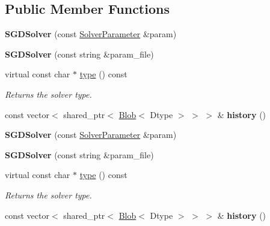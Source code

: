 \subsection*{Public Member Functions}
\begin{DoxyCompactItemize}
\item 
\mbox{\label{classcaffe_1_1_s_g_d_solver_a144735c352c1eff4e3bb3f8f03c81d4b}} 
{\bfseries S\+G\+D\+Solver} (const \mbox{\hyperlink{classcaffe_1_1_solver_parameter}{Solver\+Parameter}} \&param)
\item 
\mbox{\label{classcaffe_1_1_s_g_d_solver_ac1b30549a2cddbbb1312b7fa10aca1c6}} 
{\bfseries S\+G\+D\+Solver} (const string \&param\+\_\+file)
\item 
\mbox{\label{classcaffe_1_1_s_g_d_solver_afea4a316da9b743353d6d381d3ffce24}} 
virtual const char $\ast$ \mbox{\hyperlink{classcaffe_1_1_s_g_d_solver_afea4a316da9b743353d6d381d3ffce24}{type}} () const
\begin{DoxyCompactList}\small\item\em Returns the solver type. \end{DoxyCompactList}\item 
\mbox{\label{classcaffe_1_1_s_g_d_solver_a1797885e164748e3eea2d93154661feb}} 
const vector$<$ shared\+\_\+ptr$<$ \mbox{\hyperlink{classcaffe_1_1_blob}{Blob}}$<$ Dtype $>$ $>$ $>$ \& {\bfseries history} ()
\item 
\mbox{\label{classcaffe_1_1_s_g_d_solver_a144735c352c1eff4e3bb3f8f03c81d4b}} 
{\bfseries S\+G\+D\+Solver} (const \mbox{\hyperlink{classcaffe_1_1_solver_parameter}{Solver\+Parameter}} \&param)
\item 
\mbox{\label{classcaffe_1_1_s_g_d_solver_ac1b30549a2cddbbb1312b7fa10aca1c6}} 
{\bfseries S\+G\+D\+Solver} (const string \&param\+\_\+file)
\item 
\mbox{\label{classcaffe_1_1_s_g_d_solver_afea4a316da9b743353d6d381d3ffce24}} 
virtual const char $\ast$ \mbox{\hyperlink{classcaffe_1_1_s_g_d_solver_afea4a316da9b743353d6d381d3ffce24}{type}} () const
\begin{DoxyCompactList}\small\item\em Returns the solver type. \end{DoxyCompactList}\item 
\mbox{\label{classcaffe_1_1_s_g_d_solver_a1797885e164748e3eea2d93154661feb}} 
const vector$<$ shared\+\_\+ptr$<$ \mbox{\hyperlink{classcaffe_1_1_blob}{Blob}}$<$ Dtype $>$ $>$ $>$ \& {\bfseries history} ()
\end{DoxyCompactItemize}
